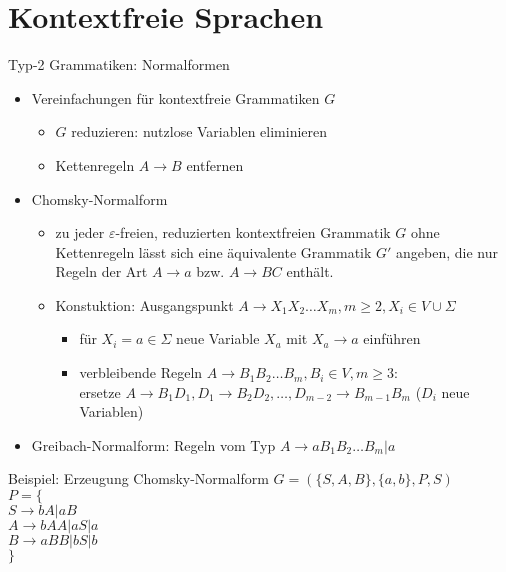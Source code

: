 \section{Kontextfreie Sprachen}

\begin{frame}{Typ-2 Grammatiken: Normalformen}
	\begin{itemize}
		\item Vereinfachungen für kontextfreie Grammatiken $G$
		\begin{itemize}
			\item $G$ reduzieren: nutzlose Variablen eliminieren
			\item Kettenregeln $A \rightarrow B$ entfernen
		\end{itemize}
		\item Chomsky-Normalform
		\begin{itemize}
			\item zu jeder $\varepsilon$-freien, reduzierten kontextfreien Grammatik $G$ ohne Kettenregeln lässt sich eine äquivalente Grammatik $G'$ angeben, die nur Regeln der Art $A \rightarrow a$ bzw. $A \rightarrow BC$ enthält.
			\item Konstuktion: Ausgangspunkt $A\rightarrow X_1X_2 \ldots X_m, m\geq 2, X_i \in V \cup \Sigma$
			\begin{itemize}
				\item für $X_i=a\in \Sigma$ neue Variable $X_a$ mit $X_a \rightarrow a$ einführen
				\item verbleibende Regeln $A \rightarrow B_1B_2\ldots B_m, B_i \in V, m\geq 3$:\\
				ersetze $A \rightarrow B_1D_1, D_1\rightarrow B_2D_2, \ldots, D_{m-2}\rightarrow B_{m-1}B_m$ ($D_i$ neue Variablen)
			\end{itemize}
		\end{itemize}
		\item Greibach-Normalform: Regeln vom Typ $A \rightarrow aB_1B_2 \ldots B_m|a$
	\end{itemize}
\end{frame}

\begin{frame}{Beispiel: Erzeugung Chomsky-Normalform}
	$G=(\{S, A, B\}, \{a, b\}, P, S)$\\
	$P=\{$\\
	\qquad\qquad $S\rightarrow bA|aB$\\
	\qquad\qquad $A\rightarrow bAA|aS|a$\\
	\qquad\qquad $B\rightarrow aBB|bS|b$\\
	\qquad$\}$
\end{frame}

